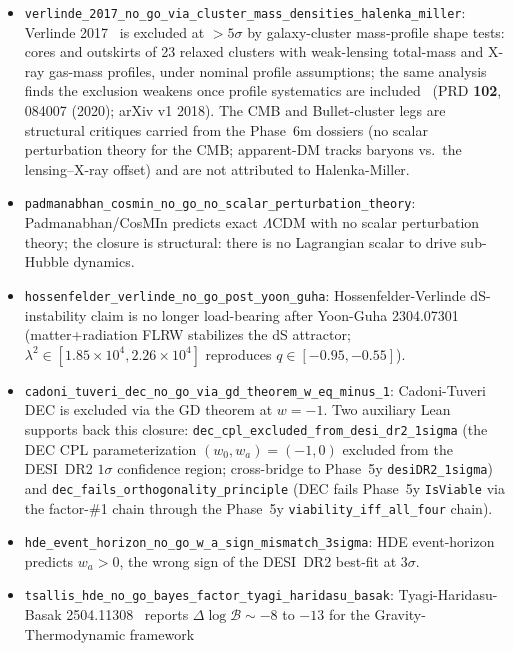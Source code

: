 \documentclass[aps,prd,reprint,nofootinbib,superscriptaddress]{revtex4-2}
\begin{document}
\begin{itemize}
\item \texttt{verlinde\_2017\_no\_go\_via\_cluster\_mass\_densities\_halenka\_miller}:
  Verlinde 2017~\cite{Verlinde2017dSEmergent} is excluded at $>5\sigma$
  by galaxy-cluster mass-profile shape tests: cores and outskirts of
  23 relaxed clusters with weak-lensing total-mass and X-ray gas-mass
  profiles, under nominal profile assumptions; the same analysis finds
  the exclusion weakens once profile systematics are
  included~\cite{HalenkaMiller2020} (PRD \textbf{102}, 084007 (2020);
  arXiv v1 2018). The CMB and Bullet-cluster legs are structural
  critiques carried from the Phase~6m dossiers
  (no scalar perturbation theory for the CMB; apparent-DM tracks
  baryons vs.\ the lensing--X-ray offset) and are not attributed to
  Halenka-Miller.
\item \texttt{padmanabhan\_cosmin\_no\_go\_no\_scalar\_perturbation\_theory}:
  Padmanabhan/CosMIn predicts exact $\Lambda$CDM with no scalar
  perturbation theory; the closure is structural: there is no
  Lagrangian scalar to drive sub-Hubble dynamics.
\item \texttt{hossenfelder\_verlinde\_no\_go\_post\_yoon\_guha}:
  Hossenfelder-Verlinde dS-instability claim is no longer load-bearing
  after Yoon-Guha 2304.07301~\cite{YoonGuha2023} (matter+radiation FLRW stabilizes the dS
  attractor; $\lambda^2 \in [1.85\!\times\!10^4, 2.26\!\times\!10^4]$
  reproduces $q \in [-0.95, -0.55]$).
\item \texttt{cadoni\_tuveri\_dec\_no\_go\_via\_gd\_theorem\_w\_eq\_minus\_1}:
  Cadoni-Tuveri DEC is excluded via the GD theorem at
  $w = -1$. Two auxiliary Lean supports back this closure:
  \texttt{dec\_cpl\_excluded\_from\_desi\_dr2\_1sigma} (the DEC CPL
  parameterization $(w_0, w_a) = (-1, 0)$ excluded from the DESI~DR2
  $1\sigma$ confidence region; cross-bridge to Phase~5y
  \texttt{desiDR2\_1sigma}) and
  \texttt{dec\_fails\_orthogonality\_principle} (DEC fails Phase~5y
  \texttt{IsViable} via the factor-\#1 chain through the Phase~5y
  \texttt{viability\_iff\_all\_four} chain).
\item \texttt{hde\_event\_horizon\_no\_go\_w\_a\_sign\_mismatch\_3sigma}:
  HDE event-horizon predicts $w_a > 0$, the wrong sign of the DESI~DR2
  best-fit at $3\sigma$.
\item \texttt{tsallis\_hde\_no\_go\_bayes\_factor\_tyagi\_haridasu\_basak}:
  Tyagi-Haridasu-Basak 2504.11308~\cite{TyagiHaridasuBasak2025} reports $\Delta\!\log\mathcal{B}
  \sim -8$ to $-13$ for the Gravity-Thermodynamic framework

\end{itemize}
\end{document}
